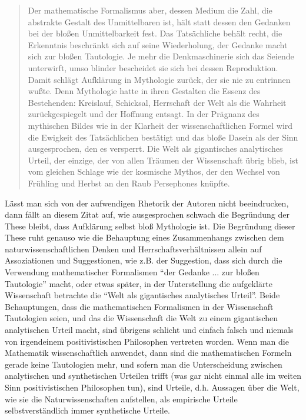 \documentclass[12pt,a4paper,ngerman]{article}
\begin{document}
\begin{quotation}

Der mathematische Formalismus aber, dessen Medium die Zahl, die
abstrakte Gestalt des Unmittelbaren ist, hält statt dessen den
Gedanken bei der bloßen Unmittelbarkeit fest. Das Tatsächliche behält
recht, die Erkenntnis beschränkt sich auf seine Wiederholung, der
Gedanke macht sich zur bloßen Tautologie. Je mehr die Denkmaschinerie
sich das Seiende unterwirft, umso blinder bescheidet sie sich bei
dessen Reproduktion. Damit schlägt Aufklärung in Mythologie zurück,
der sie nie zu entrinnen wußte. Denn Mythologie hatte in ihren
Gestalten die Essenz des Bestehenden: Kreislauf, Schicksal, Herrschaft
der Welt als die Wahrheit zurückgespiegelt und der Hoffnung
entsagt. In der Prägnanz des mythischen Bildes wie in der Klarheit der
wissenschaftlichen Formel wird die Ewigkeit des Tatsächlichen
bestätigt und das bloße Dasein als der Sinn ausgesprochen, den es
versperrt. Die Welt als gigantisches analytisches Urteil, der einzige,
der von allen Träumen der Wissenschaft übrig blieb, ist vom gleichen
Schlage wie der kosmische Mythos, der den Wechsel von Frühling und
Herbst an den Raub Persephones knüpfte. \cite[S. 33]{adorno-horkheimer:1947}

\end{quotation} 

Lässt man sich von der aufwendigen Rhetorik der Autoren nicht beeindrucken,
dann fällt an diesem Zitat auf, wie ausgesprochen schwach die Begründung der
These bleibt, dass Aufklärung selbst bloß Mythologie ist. Die Begründung
dieser These ruht genauso wie die Behauptung eines Zusammenhangs zwischen dem
naturwissenschaftlichen Denken und Herrschaftsverhältnissen allein auf
Assoziationen und Suggestionen, wie z.B. der Suggestion, dass sich durch die
Verwendung mathematischer Formalismen "`der Gedanke ... zur bloßen
Tautologie"' macht, oder etwas später, in der Unterstellung die aufgeklärte
Wissenschaft betrachte die "`Welt als gigantisches analytisches
Urteil"'. Beide Behauptungen, dass die mathematischen Formalismen in der
Wissenschaft Tautologien seien, und das die Wissenschaft die Welt zu einem
gigantischen analytischen Urteil macht, sind übrigens schlicht und einfach
falsch und niemals von irgendeinem positivistischen Philosophen vertreten
worden. Wenn man die Mathematik wissenschaftlich anwendet, dann sind die
mathematischen Formeln gerade keine Tautologien mehr, und sofern man die
Unterscheidung zwischen analytischen und synthetischen Urteilen trifft (was
gar nicht einmal alle im weiten Sinn positivistischen Philosophen tun), sind
Urteile, d.h. Aussagen über die Welt, wie sie die Naturwissenschaften
aufstellen, als empirische Urteile selbstverständlich immer synthetische
Urteile. 
\end{document}
